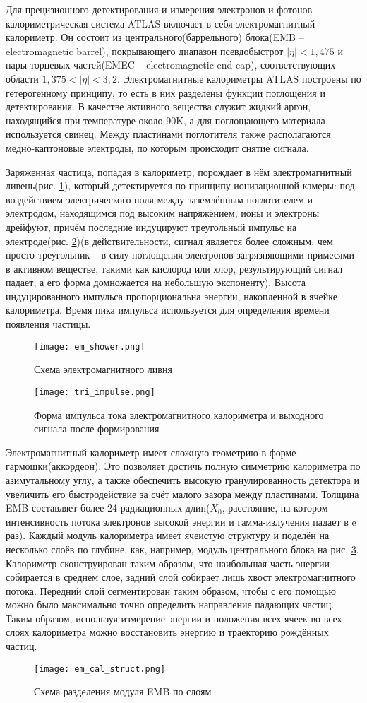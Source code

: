 Для прецизионного детектирования и измерения электронов и фотонов калориметрическая система ATLAS включает в себя электромагнитный калориметр. Он состоит из центрального(баррельного) блока(EMB -- electromagnetic barrel), покрывающего диапазон псевдобыстрот $|\eta| < 1,475$ и пары торцевых частей(EMEC -- electromagnetic end-cap), соответствующих области $1,375 < |\eta| < 3,2$. Электромагнитные калориметры ATLAS построены по гетерогенному принципу, то есть в них разделены функции поглощения и детектирования. В качестве активного вещества служит жидкий аргон, находящийся при температуре около 90K, а для поглощающего материала используется свинец. Между пластинами поглотителя также располагаются медно-каптоновые электроды, по которым происходит снятие сигнала.\par
Заряженная частица, попадая в калориметр, порождает в нём электромагнитный ливень(рис. \ref{fig:em_shower})\parencite{em_shower_wiki}, который детектируется по принципу ионизационной камеры: под воздействием электрического поля между заземлённым поглотителем и электродом, находящимся под высоким напряжением, ионы и электроны дрейфуют, причём последние индуцируют треугольный импульс на электроде(рис. \ref{fig:tri_impulse})(в действительности, сигнал является более сложным, чем просто треугольник -- в силу поглощения электронов загрязняющими примесями в активном веществе, такими как кислород или хлор, результирующий сигнал падает, а его форма домножается на небольшую экспоненту). Высота индуцированного импульса пропорциональна энергии, накопленной в ячейке калориметра. Время пика импульса используется для определения времени появления частицы.\par
\begin{figure}[ht]
    \centering
    \texttt{[image: em\_shower.png]}
    \caption{Схема электромагнитного ливня}
    \label{fig:em_shower}
\end{figure}
\begin{figure}[ht]
    \centering
    \texttt{[image: tri\_impulse.png]}
    \caption{Форма импульса тока электромагнитного калориметра и выходного сигнала после формирования}
    \label{fig:tri_impulse}
\end{figure}
Электромагнитный калориметр имеет сложную геометрию в форме гармошки(аккордеон). Это позволяет достичь полную симметрию калориметра по азимутальному углу, а также обеспечить высокую гранулированность детектора и увеличить его быстродействие за счёт малого зазора между пластинами. Толщина EMB составляет более 24 радиационных длин($X_0$, расстояние, на котором интенсивность потока электронов высокой энергии и гамма-излучения падает в e раз). Каждый модуль калориметра имеет ячеистую структуру и поделён на несколько слоёв по глубине, как, например, модуль центрального блока на рис. \ref{fig:em_cal_struct}. Калориметр сконструирован таким образом, что наибольшая часть энергии собирается в среднем слое, задний слой собирает лишь хвост электромагнитного потока. Передний слой сегментирован таким образом, чтобы с его помощью можно было максимально точно определить направление падающих частиц. Таким образом, используя измерение энергии и положения всех ячеек во всех слоях калориметра можно восстановить энергию и траекторию рождённых частиц.
\begin{figure}[ht]
    \centering
    \texttt{[image: em\_cal\_struct.png]}
    \caption{Схема разделения модуля EMB по слоям}
    \label{fig:em_cal_struct}
\end{figure}
